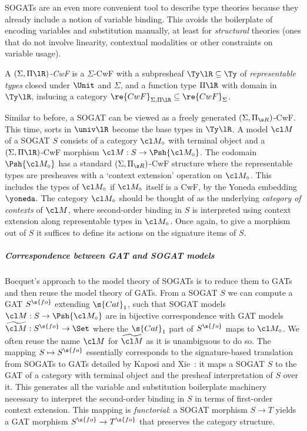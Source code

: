 \documentclass[a4paper,UKenglish,cleveref,autoref,thm-restate]{lipics-v2021}
\begin{document}
SOGATs are an even more convenient tool to describe type theories because they
already include a notion of variable binding. This avoids the boilerplate of
encoding variables and substitution manually, at least for \emph{structural}
theories (ones that do not involve linearity, contextual modalities or other
constraints on variable usage).

\begin{definition}
A \emph{$(\Sigma, \Pi\lR)$-CwF}\label{def:sigma-pir-cwf} is a $\Sigma$-CwF
  with a subpresheaf $\Ty\lR \subseteq \Ty$ of \emph{representable types}
  closed under $\Unit$ and $\Sigma$, and a function type $\Pi\lR$ with domain
  in $\Ty\lR$, inducing a category $\re{CwF}_{\Sigma, \Pi\lR} \subseteq
  \re{CwF}_\Sigma$.
\end{definition} 

Similar to before, a SOGAT can be viewed as a freely generated $(\Sigma, \Pi_{\s
R})$-CwF. This time, sorts in $\univ\lR$ become the base types in $\Ty\lR$. A
model\label{def:sogat-model} $\cl M$ of a SOGAT $S$ consists of a category $\cl
M_\diamond$ with terminal object and a $(\Sigma, \Pi\lR)$-CwF morphism $\cl M :
S \to \Psh{\cl M_\diamond}$. The codomain $\Psh{\cl M_\diamond}$ has a standard
$(\Sigma, \Pi_{\s R})$-CwF structure where the representable types are presheaves
with a `context extension' operation on $\cl M_\diamond$. This includes the types of
$\cl M_{\diamond}$ if $\cl M_{\diamond}$ itself is a CwF, by the Yoneda embedding $\yoneda$. The category $\cl M_\diamond$
should be thought of as the underlying \emph{category of contexts} of $\cl M$, where
second-order binding in $S$ is interpreted using context extension along
representable types in $\cl M_\diamond$. Once again, to give a morphism out of $S$
it suffices to define its actions on the signature items of $S$.

\subparagraph{Correspondence between GAT and SOGAT models}

Bocquet's approach to the model theory of SOGATs is to reduce them to GATs and
then reuse the model theory of GATs. From a SOGAT $S$ we can compute a GAT
$S^{\s{fo}}$ extending $\s{Cat}_1$, such that SOGAT models $\cl M : S \to \Psh
{\cl M_{\diamond}}$ are in bijective correspondence with GAT models
$\widetilde{\cl M} : S^\s{fo} \to \Set$ where the $\s{Cat}_1$ part of $S^\s{fo}$
maps to $\cl M_{\diamond}$. We often reuse the name $\cl M$ for $\widetilde{\cl
M}$ as it is unambiguous to do so. The mapping $S \mapsto S^{\s{fo}}$
essentially corresponds to the signature-based translation from SOGATs to GATs
detailed by Kaposi and Xie~\cite{Kaposi2024-db}: it maps a SOGAT $S$ to the GAT
of a category with terminal object and the presheaf interpretation of $S$ over
it. This generates all the variable and substitution boilerplate machinery
necessary to interpret the second-order binding in $S$ in terms of first-order
context extension. This mapping is \emph{functorial}: a SOGAT morphism $S \to T$
yields a GAT morphism $S^{\s{fo}} \to T^{\s{fo}}$ that preserves the category
structure.
\end{document}
